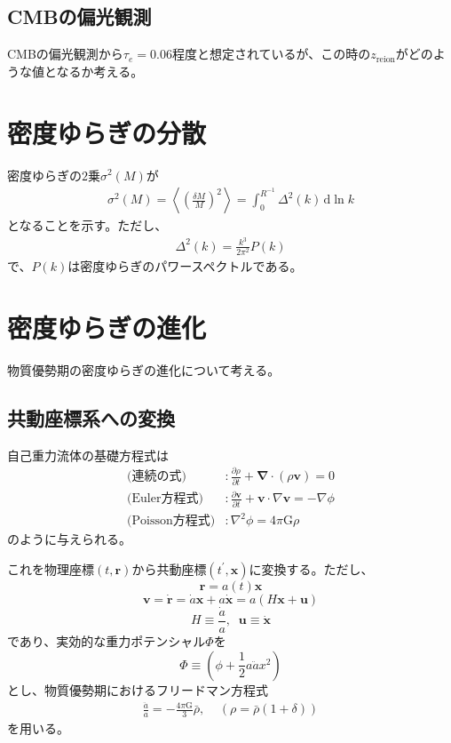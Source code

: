 \documentclass[a4paper,papersize,uplatex,dvipdfmx,10pt]{jsarticle}
\begin{document}
\subsection{CMBの偏光観測}
CMBの偏光観測から$\tau_{e}=0.06$程度と想定されているが、この時の$z_{\mathrm{reion}}$がどのような値となるか考える。

\section{密度ゆらぎの分散}
密度ゆらぎの$2$乗$\sigma^{2}(M)$が
\begin{align}
  \sigma^{2}(M) = \left< \left( \frac{\delta M}{M} \right)^{2} \right> = \int^{R^{-1}}_{0}\Delta^{2}(k)\,\mathrm{d}\ln{k}
\end{align}
となることを示す。ただし、
\begin{align}
  \Delta^{2}(k) = \frac{k^{3}}{2\pi^{2}}P(k)
\end{align}
で、$P(k)$は密度ゆらぎのパワースペクトルである。

\section{密度ゆらぎの進化}
物質優勢期の密度ゆらぎの進化について考える。
\subsection{共動座標系への変換}
自己重力流体の基礎方程式は
\begin{align}
  \text{(連続の式)}&:\frac{\partial \rho}{\partial t}+\bm{\nabla}\cdot\left( \rho \mathbf{v} \right)=0 \label{renzoku}\\
  \text{(Euler方程式)}&:\frac{\partial \mathbf{v}}{\partial t}+\mathbf{v}\cdot\nabla\mathbf{v}=-\nabla \phi \label{euler}\\
  \text{(Poisson方程式)}&:\nabla^{2}\phi = 4\pi\mathrm{G}\rho \label{poisson}
\end{align}
のように与えられる。

これを物理座標$(t,\mathbf{r})$から共動座標$(t^{\prime},\mathbf{x})$に変換する。ただし、
\begin{equation}
  \mathbf{r} = a(t)\mathbf{x}
\end{equation}
\begin{equation}
  \mathbf{v}=\dot{\mathbf{r}}=\dot{a}\mathbf{x}+a\dot{\mathbf{x}}=a\left( H\mathbf{x}+\mathbf{u} \right)
\end{equation}
\begin{equation}
  H \equiv \frac{\dot{a}}{a},\mspace{10mu}\mathbf{u}\equiv\dot{\mathbf{x}}
\end{equation}
であり、実効的な重力ポテンシャル$\Phi$を
\begin{equation}
  \Phi \equiv \left( \phi + \frac{1}{2}a\ddot{a}x^{2} \right)
\end{equation}
とし、物質優勢期におけるフリードマン方程式
\begin{align}
  \frac{\ddot{a}}{a} = -\frac{4\pi\mathrm{G}}{3}\bar{\rho},\mspace{20mu}(\rho=\bar{\rho}(1+\delta))
\end{align}
を用いる。
\end{document}
